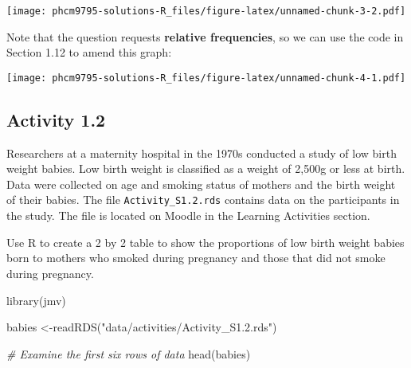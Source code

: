 \documentclass[
]{memoir}
\newenvironment{Shaded}{\begin{snugshade}}{\end{snugshade}}
\newcommand{\AttributeTok}[1]{\textcolor[rgb]{0.77,0.63,0.00}{#1}}
\newcommand{\CommentTok}[1]{\textcolor[rgb]{0.56,0.35,0.01}{\textit{#1}}}
\newcommand{\ConstantTok}[1]{\textcolor[rgb]{0.00,0.00,0.00}{#1}}
\newcommand{\DecValTok}[1]{\textcolor[rgb]{0.00,0.00,0.81}{#1}}
\newcommand{\FunctionTok}[1]{\textcolor[rgb]{0.00,0.00,0.00}{#1}}
\newcommand{\NormalTok}[1]{#1}
\newcommand{\OtherTok}[1]{\textcolor[rgb]{0.56,0.35,0.01}{#1}}
\newcommand{\SpecialCharTok}[1]{\textcolor[rgb]{0.00,0.00,0.00}{#1}}
\newcommand{\StringTok}[1]{\textcolor[rgb]{0.31,0.60,0.02}{#1}}
\begin{document}
\texttt{[image: phcm9795-solutions-R\_files/figure-latex/unnamed-chunk-3-2.pdf]}

Note that the question requests \textbf{relative frequencies}, so we can use the code in Section 1.12 to amend this graph:

\begin{Shaded}
\end{Shaded}

\texttt{[image: phcm9795-solutions-R\_files/figure-latex/unnamed-chunk-4-1.pdf]}

\hypertarget{activity-1.2}{%
\subsection*{Activity 1.2}\label{activity-1.2}}

Researchers at a maternity hospital in the 1970s conducted a study of low birth weight babies. Low birth weight is classified as a weight of 2,500g or less at birth. Data were collected on age and smoking status of mothers and the birth weight of their babies. The file \texttt{Activity\_S1.2.rds} contains data on the participants in the study. The file is located on Moodle in the Learning Activities section.

Use R to create a 2 by 2 table to show the proportions of low birth weight babies born to mothers who smoked during pregnancy and those that did not smoke during pregnancy.

\begin{Shaded}
\begin{Highlighting}[]
\FunctionTok{library}\NormalTok{(jmv)}

\NormalTok{babies }\OtherTok{\textless{}{-}}\FunctionTok{readRDS}\NormalTok{(}\StringTok{"data/activities/Activity\_S1.2.rds"}\NormalTok{)}

\CommentTok{\# Examine the first six rows of data}
\FunctionTok{head}\NormalTok{(babies)}
\end{Highlighting}
\end{Shaded}
\end{document}
